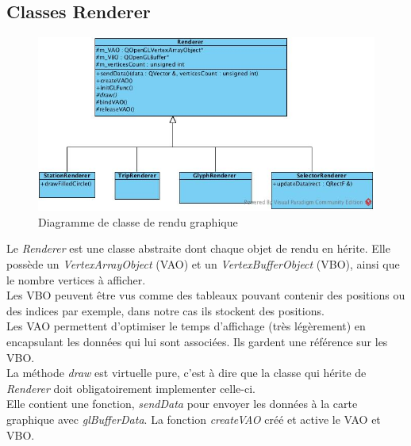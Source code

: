 \documentclass[12pt]{article}
\begin{document}
\clearpage
		\subsection{Classes Renderer}
		
		\begin{figure}[!h]
		\begin{center}
		\includegraphics[scale=.7]{dia_class_renderer.png}
		\caption{Diagramme de classe de rendu graphique}
		\label{fig:dia_class_renderer}
		\end{center}
		\end{figure}		
		
		Le \textit{Renderer} est une classe abstraite dont chaque objet de rendu en hérite. Elle possède
		un \textit{VertexArrayObject} (VAO) et un \textit{VertexBufferObject} (VBO), ainsi que le nombre vertices à afficher.\\
		
		Les VBO peuvent être vus comme des tableaux pouvant contenir des positions ou des indices par exemple, dans notre cas ils stockent des positions.\\

		Les VAO permettent d’optimiser le temps d’affichage (très légèrement) en encapsulant les données qui lui sont associées. Ils gardent une référence sur les VBO.\\
		
		La méthode \textit{draw} est virtuelle pure, c’est à dire que la classe qui hérite de \textit{Renderer} doit obligatoirement implementer celle-ci.\\

		Elle contient une fonction, \textit{sendData} pour envoyer les données à la carte graphique avec \textit{glBufferData}. La fonction \textit{createVAO} créé et active le VAO et VBO.\\		
		
\end{document}
